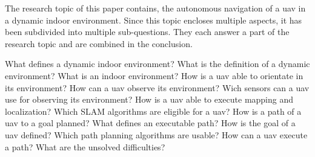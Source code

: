 The research topic of this paper contains, the autonomous navigation of a \acs{uav} in a dynamic indoor environment. Since this topic encloses multiple aspects, it has been subdivided into multiple sub\hyp{}questions. They each answer a part of the research topic and are combined in the conclusion.

\begin{outline}
  \1 What defines a dynamic indoor environment?
    \2 What is the definition of a dynamic environment?
    \2 What is an indoor environment?
  \1 How is a \acs{uav} able to orientate in its environment?
    \2 How can a \acs{uav} observe its environment?
      \3 Wich sensors can a \acs{uav} use for observing its environment?
    \2 How is a \acs{uav} able to execute mapping and localization?
      \3 Which SLAM algorithms are eligible for a \acs{uav}?
  \1 How is a path of a \acs{uav} to a goal planned?
    \2 What defines an executable path?
    \2 How is the goal of a \acs{uav} defined?
    \2 Which path planning algorithms are usable?
  \1 How can a \acs{uav} execute a path?
  \1 What are the unsolved difficulties?
\end{outline}